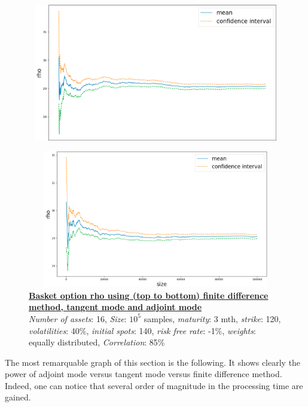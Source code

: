 \documentclass {article}
\begin{document}
			
			\begin{center}
				\begin{figure}[!h]
					\centering
				            \includegraphics[width=15cm, height=6cm]{stdBasketOptionTangentModeRho.png}
				\end{figure}
			\end{center}

			\begin{center}
				\begin{figure}[!h]
					\centering
				            \includegraphics[width=15cm, height=6cm]{stdBasketOptionAdjointModeRho.png}
							\caption{\textbf{\underline{Basket option rho using (top to bottom) finite difference method, tangent mode and adjoint mode}} 
							\\ \textit{Number of assets}: 16, \textit{Size}: $10^{5}$ samples, \textit{maturity}: 3 mth, \textit{strike}: 120, \textit{volatilities}: 40\%, \textit{initial spots}: 140, \textit{risk free rate}: -1\%, \textit{weights}: equally distributed, \textit{Correlation}: 85\%}
				\end{figure}
			\end{center}

			\newpage

			The most remarquable graph of this section is the following.
			It shows clearly the power of adjoint mode versus tangent mode versus finite difference method. \\
			Indeed, one can notice that several order of magnitude in the processing time are gained.
\end{document}
